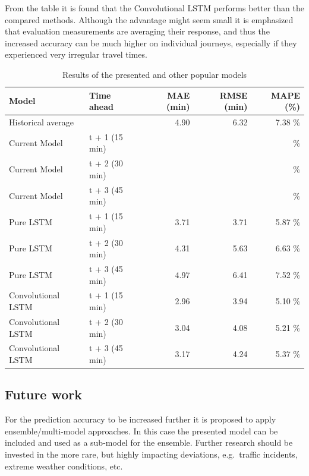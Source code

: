 \documentclass[preprint,11pt,5p,twocolumn]{elsarticle}
\begin{document}
From the table it is found that the Convolutional LSTM performs better than the compared methods. Although the advantage might seem small it is emphasized that evaluation measurements are averaging their response, and thus the increased accuracy can be much higher on individual journeys, especially if they experienced very irregular travel times.

\begin{table}[!ht]
    \caption{Results of the presented and other popular models}
    \label{tab:results}
    \center
    \begin{tabular}{ll|rrr}
        Model & Time ahead & MAE (min) & RMSE (min) & MAPE (\%) \\
        \hline 
        Historical average &                & 4.90 & 6.32 & 7.38 \% \\ 
        \hline 
        Current Model      & t + 1 (15 min) &  &  &  \% \\ 
        Current Model      & t + 2 (30 min) &  &  &  \% \\ 
        Current Model      & t + 3 (45 min) &  &  &  \% \\ 
        \hline 
        Pure LSTM          & t + 1 (15 min) & 3.71 & 3.71 & 5.87 \% \\
        Pure LSTM          & t + 2 (30 min) & 4.31 & 5.63 & 6.63 \% \\
        Pure LSTM          & t + 3 (45 min) & 4.97 & 6.41 & 7.52 \% \\
        \hline 
        Convolutional LSTM & t + 1 (15 min) & 2.96 & 3.94 & 5.10 \% \\
        Convolutional LSTM & t + 2 (30 min) & 3.04 & 4.08 & 5.21 \% \\
        Convolutional LSTM & t + 3 (45 min) & 3.17 & 4.24 & 5.37 \% \\
        \hline 
    \end{tabular}
\end{table}

\subsection{Future work}
For the prediction accuracy to be increased further it is proposed to apply ensemble/multi-model approaches. In this case the presented model can be included and used as a sub-model for the ensemble. Further research should be invested in the more rare, but highly impacting deviations, e.g.\ traffic incidents, extreme weather conditions, etc.
\end{document}
